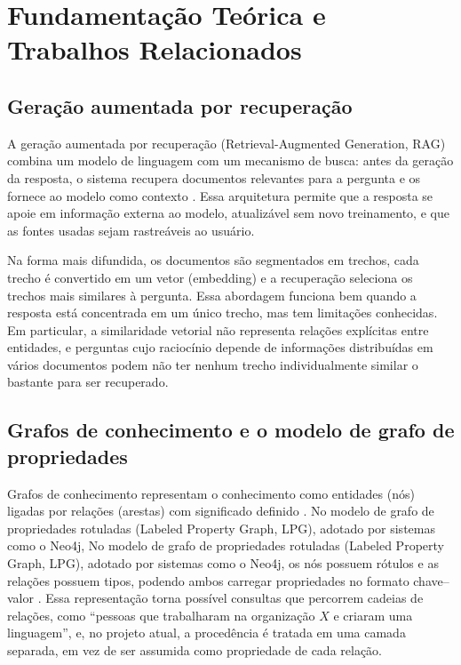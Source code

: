 
\section{Fundamentação Teórica e Trabalhos Relacionados}
\label{sec:fundamentacao}

\subsection{Geração aumentada por recuperação}

A geração aumentada por recuperação (Retrieval-Augmented Generation, RAG) combina um modelo de linguagem com um mecanismo de busca: antes da geração da resposta, o sistema recupera documentos relevantes para a pergunta e os fornece ao modelo como contexto \cite{lewis2020rag}. Essa arquitetura permite que a resposta se apoie em informação externa ao modelo, atualizável sem novo treinamento, e que as fontes usadas sejam rastreáveis ao usuário.

Na forma mais difundida, os documentos são segmentados em trechos, cada trecho é convertido em um vetor (embedding) e a recuperação seleciona os trechos mais similares à pergunta. Essa abordagem funciona bem quando a resposta está concentrada em um único trecho, mas tem limitações conhecidas. Em particular, a similaridade vetorial não representa relações explícitas entre entidades, e perguntas cujo raciocínio depende de informações distribuídas em vários documentos podem não ter nenhum trecho individualmente similar o bastante para ser recuperado.

\subsection{Grafos de conhecimento e o modelo de grafo de propriedades}

Grafos de conhecimento representam o conhecimento como entidades (nós) ligadas por relações (arestas) com significado definido \cite{hogan2021kg}. No modelo de grafo de propriedades rotuladas (Labeled Property Graph, LPG), adotado por sistemas como o Neo4j, No modelo de grafo de propriedades rotuladas (Labeled Property Graph, LPG), adotado por sistemas como o Neo4j, os nós possuem rótulos e as relações possuem tipos, podendo ambos carregar propriedades no formato chave--valor \cite{angles2018pg,robinson2015graphdb}. Essa representação torna possível consultas que percorrem cadeias de relações, como ``pessoas que trabalharam na organização $X$ e criaram uma linguagem'', e, no projeto atual, a procedência é tratada em uma camada separada, em vez de ser assumida como propriedade de cada relação.

